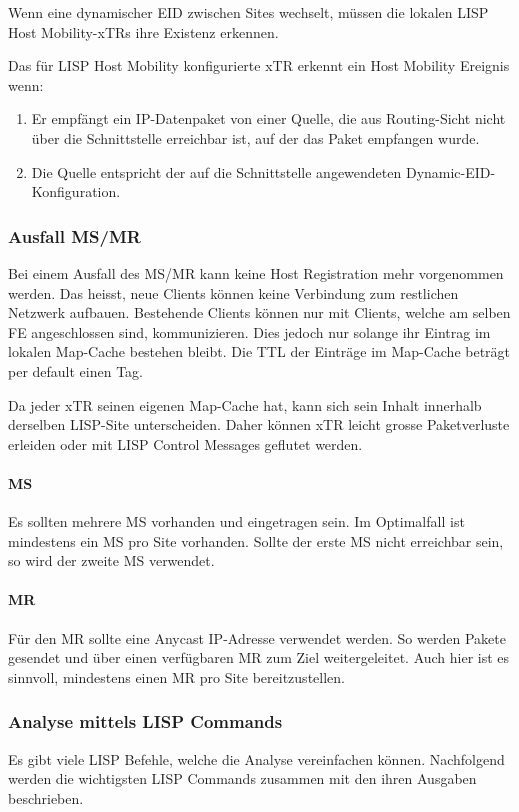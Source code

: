 Wenn eine dynamischer EID zwischen Sites wechselt, müssen die lokalen LISP Host Mobility-xTRs ihre Existenz erkennen. 

Das für LISP Host Mobility konfigurierte xTR erkennt ein Host Mobility Ereignis wenn:
\begin{enumerate}
	\item Er empfängt ein IP-Datenpaket von einer Quelle, die aus Routing-Sicht nicht über die Schnittstelle erreichbar ist, auf der das Paket empfangen wurde.
	\item Die Quelle entspricht der auf die Schnittstelle angewendeten Dynamic-EID-Kon\-figuration.
\end{enumerate}


\subsubsection{Ausfall MS/MR}
Bei einem Ausfall des MS/MR kann keine Host Registration mehr vorgenommen werden. Das heisst, neue Clients können keine Verbindung zum restlichen Netzwerk aufbauen. Bestehende Clients können nur mit Clients, welche am selben FE angeschlossen sind, kommunizieren. Dies jedoch nur solange ihr Eintrag im lokalen Map-Cache bestehen bleibt. Die TTL der Einträge im Map-Cache beträgt per default einen Tag. 

Da jeder xTR seinen eigenen Map-Cache hat, kann sich sein Inhalt innerhalb derselben LISP-Site unterscheiden. Daher können xTR leicht grosse Paketverluste erleiden oder mit LISP Control Messages geflutet werden.  

\paragraph{MS}
Es sollten mehrere MS vorhanden und eingetragen sein. Im Optimalfall ist mindestens ein MS pro Site vorhanden. Sollte der erste MS nicht erreichbar sein, so wird der zweite MS verwendet.

\paragraph{MR}
Für den MR sollte eine Anycast IP-Adresse verwendet werden. So werden Pakete gesendet und über einen verfügbaren MR zum Ziel weitergeleitet. Auch hier ist es sinnvoll, mindestens einen MR pro Site bereitzustellen.

\subsubsection{Analyse mittels LISP Commands}
Es gibt viele LISP Befehle, welche die Analyse vereinfachen können. Nachfolgend werden die wichtigsten LISP Commands zusammen mit den ihren Ausgaben beschrieben. \cite{lisp-commands}

